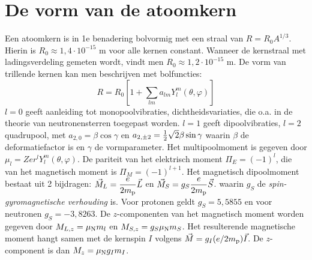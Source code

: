 \section{De vorm van de atoomkern}
Een atoomkern is in 1e benadering bolvormig met een straal van $R=R_0A^{1/3}$.
Hierin is $R_0\approx1,4\cdot10^{-15}$ m voor alle kernen constant. Wanneer
de kernstraal met ladingsverdeling gemeten wordt, vindt men
$R_0\approx1,2\cdot10^{-15}$ m. De vorm van trillende kernen kan men
beschrijven met bolfuncties:
\[
R=R_0\left[1+\sum_{lm}a_{lm}Y_l^m(\theta,\varphi)\right]
\]
$l=0$ geeft aanleiding tot monopoolvibraties, dichtheidsvariaties, die o.a.
in de theorie van neutronensterren toegepast worden. $l=1$ geeft
dipoolvibraties, $l=2$ quadrupool, met $a_{2,0}=\beta\cos\gamma$ en
$a_{2,\pm2}=\mbox{$\frac{1}{2}$}\sqrt{2}\beta\sin\gamma$ waarin $\beta$ de deformatiefactor
is en $\gamma$ de vormparameter. Het multipoolmoment is gegeven door
$\mu_l=Zer^lY_l^m(\theta,\varphi)$. De pariteit van het elektrisch moment
$\Pi_E=(-1)^l$, die van het magnetisch moment is $\Pi_M=(-1)^{l+1}$.
\npar
Het magnetisch dipoolmoment bestaat uit 2 bijdragen:
$\displaystyle\vec{M}_L=\frac{e}{2m_{\rm p}}\vec{L}$ en
$\displaystyle\vec{M}_S=g_S\frac{e}{2m_{\rm p}}\vec{S}$.
\npar
waarin $g_S$ de {\it spin-gyromagnetische verhouding} is. Voor protonen geldt
$g_S=5,5855$ en voor neutronen $g_S=-3,8263$. De $z$-componenten van het
magnetisch moment worden gegeven door $M_{L,z}=\mu_{\rm N}m_l$ en
$M_{S,z}=g_S\mu_{\rm N}m_S$. Het resulterende magnetische moment hangt samen
met de kernspin $I$ volgens $\vec{M}=g_I(e/2m_{\rm p})\vec{I}$. De
$z$-component is dan $M_z=\mu_{\rm N}g_Im_I$.

